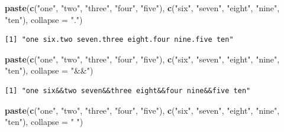 \documentclass[
]{krantz}
\makeatletter
\newenvironment{Shaded}{\begin{snugshade}}{\end{snugshade}}
\newcommand{\DataTypeTok}[1]{\textcolor[rgb]{0.27,0.27,0.27}{#1}}
\newcommand{\KeywordTok}[1]{\textcolor[rgb]{0.27,0.27,0.27}{\textbf{#1}}}
\newcommand{\NormalTok}[1]{#1}
\newcommand{\StringTok}[1]{\textcolor[rgb]{0.5,0.5,0.5}{#1}}
\newenvironment{kframe}{%
\medskip{}
\setlength{\fboxsep}{.8em}
 \def\at@end@of@kframe{}%
 \ifinner\ifhmode%
  \def\at@end@of@kframe{\end{minipage}}%
  \begin{minipage}{\columnwidth}%
 \fi\fi%
 \def\FrameCommand##1{\hskip\@totalleftmargin \hskip-\fboxsep
 \colorbox{shadecolor}{##1}\hskip-\fboxsep
     \hskip-\linewidth \hskip-\@totalleftmargin \hskip\columnwidth}%
 \MakeFramed {\advance\hsize-\width
   \@totalleftmargin\z@ \linewidth\hsize
   \@setminipage}}%
 {\par\unskip\endMakeFramed%
 \at@end@of@kframe}
\renewenvironment{Shaded}{\begin{kframe}}{\end{kframe}}
\makeatother
\begin{document}
\begin{Shaded}
\begin{Highlighting}[]
\KeywordTok{paste}\NormalTok{(}\KeywordTok{c}\NormalTok{(}\StringTok{"one"}\NormalTok{, }\StringTok{"two"}\NormalTok{, }\StringTok{"three"}\NormalTok{, }\StringTok{"four"}\NormalTok{, }\StringTok{"five"}\NormalTok{), }
      \KeywordTok{c}\NormalTok{(}\StringTok{"six"}\NormalTok{, }\StringTok{"seven"}\NormalTok{, }\StringTok{"eight"}\NormalTok{, }\StringTok{"nine"}\NormalTok{, }\StringTok{"ten"}\NormalTok{), }\DataTypeTok{collapse =} \StringTok{"."}\NormalTok{)}
\end{Highlighting}
\end{Shaded}

\begin{verbatim}
[1] "one six.two seven.three eight.four nine.five ten"
\end{verbatim}

\begin{Shaded}
\begin{Highlighting}[]
\KeywordTok{paste}\NormalTok{(}\KeywordTok{c}\NormalTok{(}\StringTok{"one"}\NormalTok{, }\StringTok{"two"}\NormalTok{, }\StringTok{"three"}\NormalTok{, }\StringTok{"four"}\NormalTok{, }\StringTok{"five"}\NormalTok{),  }
      \KeywordTok{c}\NormalTok{(}\StringTok{"six"}\NormalTok{, }\StringTok{"seven"}\NormalTok{, }\StringTok{"eight"}\NormalTok{, }\StringTok{"nine"}\NormalTok{, }\StringTok{"ten"}\NormalTok{), }\DataTypeTok{collapse =} \StringTok{"\&\&"}\NormalTok{)}
\end{Highlighting}
\end{Shaded}

\begin{verbatim}
[1] "one six&&two seven&&three eight&&four nine&&five ten"
\end{verbatim}

\begin{Shaded}
\begin{Highlighting}[]
\KeywordTok{paste}\NormalTok{(}\KeywordTok{c}\NormalTok{(}\StringTok{"one"}\NormalTok{, }\StringTok{"two"}\NormalTok{, }\StringTok{"three"}\NormalTok{, }\StringTok{"four"}\NormalTok{, }\StringTok{"five"}\NormalTok{),}
      \KeywordTok{c}\NormalTok{(}\StringTok{"six"}\NormalTok{, }\StringTok{"seven"}\NormalTok{, }\StringTok{"eight"}\NormalTok{, }\StringTok{"nine"}\NormalTok{, }\StringTok{"ten"}\NormalTok{), }\DataTypeTok{collapse =} \StringTok{" "}\NormalTok{)}
\end{Highlighting}
\end{Shaded}
\end{document}
